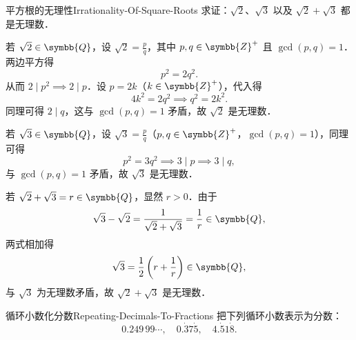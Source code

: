 \begin{problem}{平方根的无理性}{Irrationality-Of-Square-Roots}
    求证：$\sqrt{2}$、$\sqrt{3}$ 以及 $\sqrt{2} + \sqrt{3}$ 都是无理数．
\end{problem}

\begin{myproof}
    若 $\sqrt{2} \in \symbb{Q}$，设 $\sqrt{2} = \frac{p}{q}$，其中 $p, q \in \symbb{Z}^+$ 且 $\gcd(p, q) = 1$．两边平方得
    \begin{equation}
        p^2 = 2q^2.
    \end{equation}
    从而 $2 \mid p^2 \implies 2 \mid p$．设 $p = 2k$（$k \in \symbb{Z}^+$），代入得
    \begin{equation}
        4k^2 = 2q^2 \implies q^2 = 2k^2.
    \end{equation}
    同理可得 $2 \mid q$，这与 $\gcd(p, q) = 1$ 矛盾，故 $\sqrt{2}$ 是无理数．

    若 $\sqrt{3} \in \symbb{Q}$，设 $\sqrt{3} = \frac{p}{q}$（$p, q \in \symbb{Z}^+$，$\gcd(p, q) = 1$），同理可得
    \begin{equation}
        p^2 = 3q^2 \implies 3 \mid p \implies 3 \mid q,
    \end{equation}
    与 $\gcd(p, q) = 1$ 矛盾，故 $\sqrt{3}$ 是无理数．

    若 $\sqrt{2} + \sqrt{3} = r \in \symbb{Q}$，显然 $r > 0$．由于
    \begin{equation}
        \sqrt{3} - \sqrt{2} = \frac{1}{\sqrt{2} + \sqrt{3}} = \frac{1}{r} \in \symbb{Q},
    \end{equation}
    两式相加得
    \begin{equation}
        \sqrt{3} = \frac{1}{2}\left(r + \frac{1}{r}\right) \in \symbb{Q},
    \end{equation}
    与 $\sqrt{3}$ 为无理数矛盾，故 $\sqrt{2} + \sqrt{3}$ 是无理数．
\end{myproof}

\begin{problem}{循环小数化分数}{Repeating-Decimals-To-Fractions}
    把下列循环小数表示为分数：
    \begin{equation}
        0.249\,99\cdots, \quad 0.\dot{3}7\dot{5}, \quad 4.\dot{5}1\dot{8}.
    \end{equation}
\end{problem}

